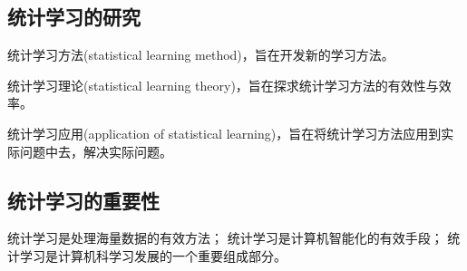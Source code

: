 \subsection*{统计学习的研究}
统计学习方法(statistical learning method)，旨在开发新的学习方法。

统计学习理论(statistical learning theory)，旨在探求统计学习方法的有效性与效率。

统计学习应用(application of statistical learning)，旨在将统计学习方法应用到实际问题中去，解决实际问题。
\subsection*{统计学习的重要性}
统计学习是处理海量数据的有效方法；
统计学习是计算机智能化的有效手段；
统计学习是计算机科学习发展的一个重要组成部分。




